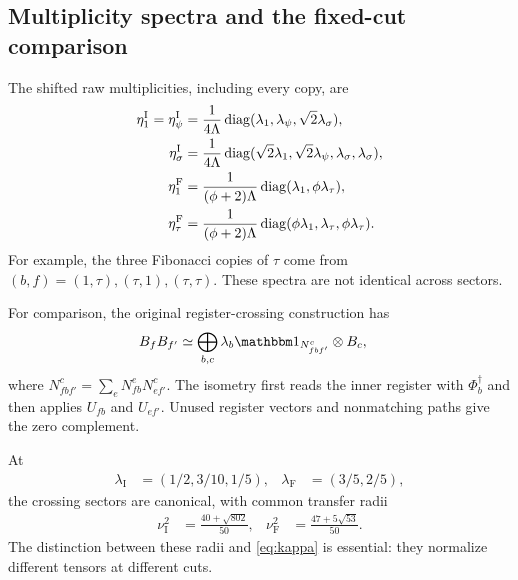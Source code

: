 \subsection{Multiplicity spectra and the fixed-cut comparison}

The shifted raw multiplicities, including every copy, are
\begin{align}
	\eta_1^{\mathrm I}=\eta_\psi^{\mathrm I}
	 & =\frac1{4\Lambda}
	\operatorname{diag}(\lambda_1,\lambda_\psi,\sqrt2\lambda_\sigma), \\
	\eta_\sigma^{\mathrm I}
	 & =\frac1{4\Lambda}
	\operatorname{diag}(\sqrt2\lambda_1,\sqrt2\lambda_\psi,
	\lambda_\sigma,\lambda_\sigma),                     \\
	\eta_1^{\mathrm F}
	 & =\frac1{(\phi+2)\Lambda}
	\operatorname{diag}(\lambda_1,\phi\lambda_\tau),                  \\
	\eta_\tau^{\mathrm F}
	 & =\frac1{(\phi+2)\Lambda}
	\operatorname{diag}(\phi\lambda_1,\lambda_\tau,\phi\lambda_\tau).
	\label{eq:category-spectra}
\end{align}
For example, the three Fibonacci copies of $\tau$ come from
$(b,f)=(1,\tau),(\tau,1),(\tau,\tau)$. These spectra are not
identical across sectors.

For comparison, the original register-crossing construction has
\begin{align}
	B_fB_{f'}
	 & \simeq\bigoplus_{b,c}\lambda_b
	\Id_{N_{fbf'}^c}\otimes B_c,
	\label{eq:crossing-fusion}
\end{align}
where $N_{fbf'}^c=\sum_eN_{fb}^eN_{ef'}^c$.
The isometry first reads the inner register with $\Phi_b^\dagger$
and then applies $U_{fb}$ and $U_{ef'}$. Unused register vectors
and nonmatching paths give the zero complement.

At
\begin{align}
	\lambda_{\mathrm I} & =(1/2,3/10,1/5), &
	\lambda_{\mathrm F} & =(3/5,2/5),
	\label{eq:certified-weights}
\end{align}
the crossing sectors are canonical, with common transfer radii
\begin{align}
	\nu_{\mathrm I}^2 & =\frac{40+\sqrt{802}}{50}, &
	\nu_{\mathrm F}^2 & =\frac{47+5\sqrt{53}}{50}.
	\label{eq:crossing-radii}
\end{align}
The distinction between these radii and \cref{eq:kappa} is
essential: they normalize different tensors at different cuts.

